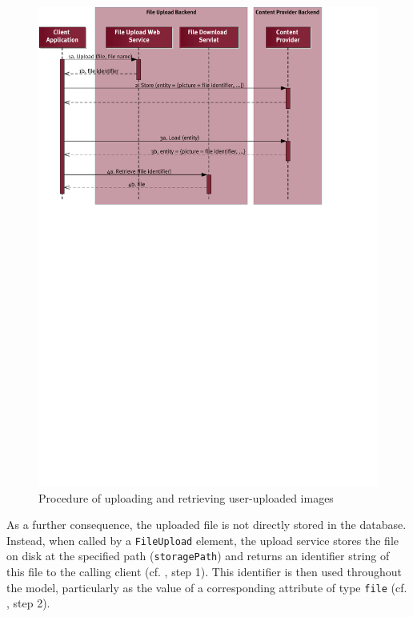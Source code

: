 \begin{figure}[b!]
\centering %
\includegraphics[clip,  trim=0 17.4cm 3.cm 0, scale=0.8]{Fig/upload-sequence.pdf}
\caption{Procedure of uploading and retrieving user-uploaded images}
\label{fig:remoteFileUpload}
\end{figure}

As a further consequence, the uploaded file is not directly stored in the database. Instead, when called by a \lstinline|FileUpload| element, the upload service stores the file on disk at the specified path (\lstinline|storagePath|) and returns an identifier string of this file to the calling client (cf. , step 1).
This identifier is then used throughout the model, particularly as the value of a corresponding attribute of type \lstinline|file|  (cf. , step 2).

